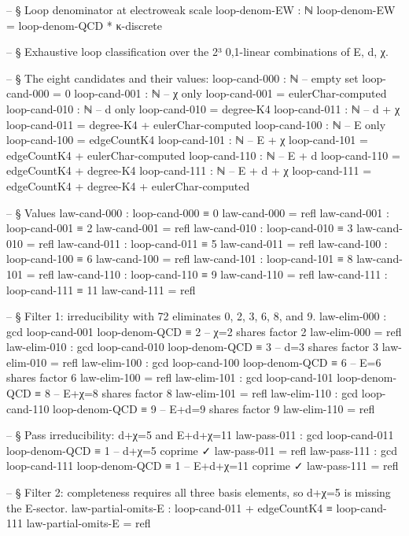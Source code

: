 \documentclass[11pt,a4paper]{book}
\begin{document}
\begin{code}
-- § Loop denominator at electroweak scale
loop-denom-EW : ℕ
loop-denom-EW = loop-denom-QCD * κ-discrete



-- § Exhaustive loop classification over the 2³ {0,1}-linear combinations of {E, d, χ}.

-- § The eight candidates and their values:
loop-cand-000 : ℕ           -- empty set
loop-cand-000 = 0
loop-cand-001 : ℕ           -- χ only
loop-cand-001 = eulerChar-computed
loop-cand-010 : ℕ           -- d only
loop-cand-010 = degree-K4
loop-cand-011 : ℕ           -- d + χ
loop-cand-011 = degree-K4 + eulerChar-computed
loop-cand-100 : ℕ           -- E only
loop-cand-100 = edgeCountK4
loop-cand-101 : ℕ           -- E + χ
loop-cand-101 = edgeCountK4 + eulerChar-computed
loop-cand-110 : ℕ           -- E + d
loop-cand-110 = edgeCountK4 + degree-K4
loop-cand-111 : ℕ           -- E + d + χ
loop-cand-111 = edgeCountK4 + degree-K4 + eulerChar-computed

-- § Values
law-cand-000 : loop-cand-000 ≡ 0
law-cand-000 = refl
law-cand-001 : loop-cand-001 ≡ 2
law-cand-001 = refl
law-cand-010 : loop-cand-010 ≡ 3
law-cand-010 = refl
law-cand-011 : loop-cand-011 ≡ 5
law-cand-011 = refl
law-cand-100 : loop-cand-100 ≡ 6
law-cand-100 = refl
law-cand-101 : loop-cand-101 ≡ 8
law-cand-101 = refl
law-cand-110 : loop-cand-110 ≡ 9
law-cand-110 = refl
law-cand-111 : loop-cand-111 ≡ 11
law-cand-111 = refl



-- § Filter 1: irreducibility with 72 eliminates 0, 2, 3, 6, 8, and 9.
law-elim-000 : gcd loop-cand-001 loop-denom-QCD ≡ 2   -- χ=2 shares factor 2
law-elim-000 = refl
law-elim-010 : gcd loop-cand-010 loop-denom-QCD ≡ 3   -- d=3 shares factor 3
law-elim-010 = refl
law-elim-100 : gcd loop-cand-100 loop-denom-QCD ≡ 6   -- E=6 shares factor 6
law-elim-100 = refl
law-elim-101 : gcd loop-cand-101 loop-denom-QCD ≡ 8   -- E+χ=8 shares factor 8
law-elim-101 = refl
law-elim-110 : gcd loop-cand-110 loop-denom-QCD ≡ 9   -- E+d=9 shares factor 9
law-elim-110 = refl

-- § Pass irreducibility: d+χ=5 and E+d+χ=11
law-pass-011 : gcd loop-cand-011 loop-denom-QCD ≡ 1   -- d+χ=5 coprime ✓
law-pass-011 = refl
law-pass-111 : gcd loop-cand-111 loop-denom-QCD ≡ 1   -- E+d+χ=11 coprime ✓
law-pass-111 = refl



-- § Filter 2: completeness requires all three basis elements, so d+χ=5 is missing the E-sector.
law-partial-omits-E : loop-cand-011 + edgeCountK4 ≡ loop-cand-111
law-partial-omits-E = refl


\end{code}
\end{document}
